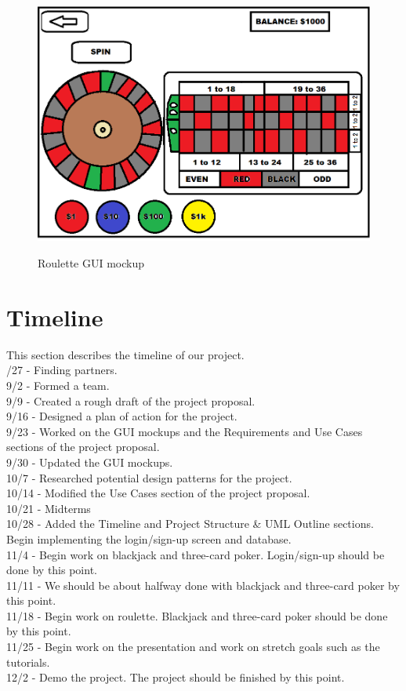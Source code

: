 \documentclass[10pt,conference,onecolumn,compsoc]{IEEEtran}
\begin{document}
\begin{figure}[h]
\caption{Roulette GUI mockup}
\includegraphics[scale=0.4]{roulette}
\label{fig:roulette}
\centering
\end{figure}

\newpage

\section{Timeline}
\noindent
This section describes the timeline of our project.\\
/27 - Finding partners.\\
9/2 - Formed a team.\\
9/9 - Created a rough draft of the project proposal.\\
9/16 - Designed a plan of action for the project.\\
9/23 - Worked on the GUI mockups and the Requirements and Use Cases sections of the project proposal.\\
9/30 - Updated the GUI mockups.\\
10/7 - Researched potential design patterns for the project.\\
10/14 - Modified the Use Cases section of the project proposal.\\
10/21 - Midterms\\
10/28 - Added the Timeline and Project Structure \& UML Outline sections. Begin implementing the login/sign-up screen and database.\\
11/4 - Begin work on blackjack and three-card poker. Login/sign-up should be done by this point.\\
11/11 - We should be about halfway done with blackjack and three-card poker by this point.\\
11/18 - Begin work on roulette. Blackjack and three-card poker should be done by this point.\\
11/25 - Begin work on the presentation and work on stretch goals such as the tutorials.\\
12/2 - Demo the project. The project should be finished by this point.\\
\end{document}

